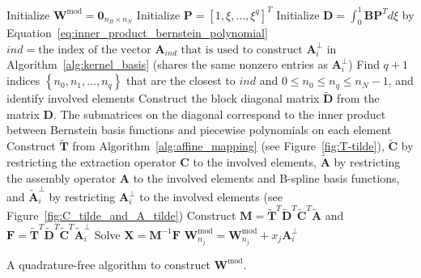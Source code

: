 \begin{algorithm}

	\BlankLine
	Initialize $\mathbf{W}^\text{mod}=\mathbf{0}_{n_B \times n_N }$\;
	Initialize $\mathbf{P}=\left[{1, \xi,\dots,\xi^q}\right]^T$\;
	Initialize $\mathbf{D}=\int_0^1 \mathbf{B} \mathbf{P}^T d\xi$ by Equation~\eqref{eq:inner_product_bernstein_polynomial}\;
	{
	$ind =\text{the index of the vector $\mathbf{A}_{ind}$ that is used to construct $\mathbf{A}^\perp_i$}$ in Algorithm~\ref{alg:kernel_basis} (shares the same nonzero entries as $\mathbf{A}^\perp_i$)\;
	Find $q+1$ indices $\left\{{n_0,n_1,\dots,n_{q}}\right\}$ that are the closest to $ind$ and $0\leq{}n_0\leq{}n_q\leq{}n_N-1$, and identify involved elements\;
	Construct the block diagonal matrix $\tilde{\mathbf{D}}$ from the matrix $\mathbf{D}$. The submatrices on the diagonal correspond to the inner product between Bernstein basis functions and piecewise polynomials on each element \;
	Construct $\tilde{\mathbf{T}}$ from Algorithm~\ref{alg:affine_mapping} (see Figure~\ref{fig:T-tilde}), $\tilde{\mathbf{C}}$ by restricting the extraction operator $\mathbf{C}$ to the involved elements, $\tilde{\mathbf{A}}$ by restricting the assembly operator $\mathbf{A}$ to the involved elements and B-spline basis functions, and $\tilde{\mathbf{A}}^\perp_i$ by restricting ${\mathbf{A}}^\perp_i$ to the involved elements (see Figure~\ref{fig:C_tilde_and_A_tilde})\;
	Construct $\mathbf{M}=\tilde{\mathbf{T}}^T \tilde{\mathbf{D}}^T \tilde{\mathbf{C}}^T \tilde{\mathbf{A}}$ and $\mathbf{F}=\tilde{\mathbf{T}}^T \tilde{\mathbf{D}}^T \tilde{\mathbf{C}}^T \tilde{\mathbf{A}}^\perp_i$\;
	Solve $\mathbf{X}=\mathbf{M}^{-1}\mathbf{F}$\;
	{
		$\mathbf{W}^\text{mod}_{n_j}=\mathbf{W}^\text{mod}_{n_j}+x_j\mathbf{A}^\perp_i$\;
	}
	}
	\caption{A quadrature-free algorithm to construct $\mathbf{W}^\text{mod}$.}\label{alg:modification_weight_new}
\end{algorithm}

